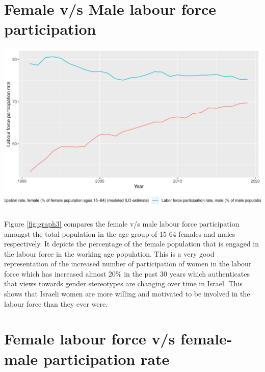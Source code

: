 \documentclass[11pt,a4paper,]{article}
\let\origfigure\figure
\let\endorigfigure\endfigure
\renewenvironment{figure}[1][2] {
    \expandafter\origfigure\expandafter[H]
} {
    \endorigfigure
}%
\begin{document}
\hypertarget{female-vs-male-labour-force-participation}{%
\section{Female v/s Male labour force participation}\label{female-vs-male-labour-force-participation}}

\begin{figure}
\centering
\includegraphics{report_files/figure-latex/graph3-1.pdf}
\caption{\label{fig:graph3}Female v/s Male labour force participation}
\end{figure}

Figure \ref{fig:graph3} compares the female v/s male labour force participation amongst the total population in the age group of 15-64 females and males respectively. It depicts the percentage of the female population that is engaged in the labour force in the working age population. This is a very good representation of the increased number of participation of women in the labour force which has increased almost 20\% in the past 30 years which authenticates that views towards gender stereotypes are changing over time in Israel. This shows that Israeli women are more willing and motivated to be involved in the labour force than they ever were.

\hypertarget{female-labour-force-vs-female-male-participation-rate}{%
\section{Female labour force v/s female-male participation rate}\label{female-labour-force-vs-female-male-participation-rate}}
\end{document}
